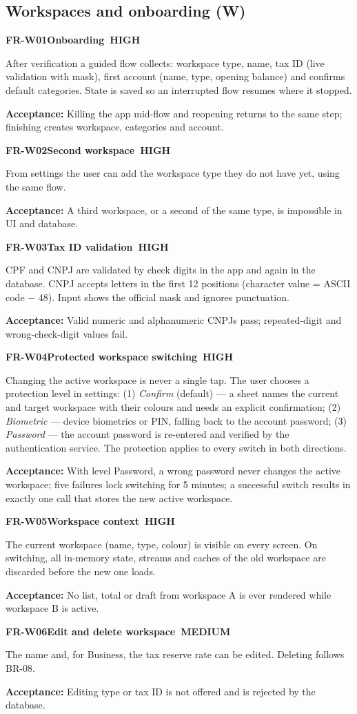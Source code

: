 \documentclass[11pt,a4paper]{article}
\newcommand{\PH}{\colorbox{finlyblue}{\color{white}\scriptsize\bfseries\ HIGH\ }}
\newcommand{\PM}{\colorbox{finlygold}{\color{finlydark}\scriptsize\bfseries\ MEDIUM\ }}
\newcommand{\req}[5]{%
  \begin{tcolorbox}[reqbox]
    {\small\textbf{\textcolor{finlyblue}{#1}}\quad\textbf{#2}\hfill #3}\par\vspace{2pt}
    {\small #4}\par\vspace{2pt}
    {\footnotesize\textcolor{finlytext}{\textbf{Acceptance:} #5}}
  \end{tcolorbox}}
\begin{document}
\subsection{Workspaces and onboarding (W)}
\req{FR-W01}{Onboarding}{\PH}{After verification a guided flow collects: workspace type, name, tax ID (live validation with mask), first account (name, type, opening balance) and confirms default categories. State is saved so an interrupted flow resumes where it stopped.}
{Killing the app mid-flow and reopening returns to the same step; finishing creates workspace, categories and account.}
\req{FR-W02}{Second workspace}{\PH}{From settings the user can add the workspace type they do not have yet, using the same flow.}
{A third workspace, or a second of the same type, is impossible in UI and database.}
\req{FR-W03}{Tax ID validation}{\PH}{CPF and CNPJ are validated by check digits in the app and again in the database. CNPJ accepts letters in the first 12 positions (character value = ASCII code $-$ 48). Input shows the official mask and ignores punctuation.}
{Valid numeric and alphanumeric CNPJs pass; repeated-digit and wrong-check-digit values fail.}
\req{FR-W04}{Protected workspace switching}{\PH}{Changing the active workspace is never a single tap. The user chooses a protection level in settings: (1) \emph{Confirm} (default) --- a sheet names the current and target workspace with their colours and needs an explicit confirmation; (2) \emph{Biometric} --- device biometrics or PIN, falling back to the account password; (3) \emph{Password} --- the account password is re-entered and verified by the authentication service. The protection applies to every switch in both directions.}
{With level Password, a wrong password never changes the active workspace; five failures lock switching for 5 minutes; a successful switch results in exactly one call that stores the new active workspace.}
\req{FR-W05}{Workspace context}{\PH}{The current workspace (name, type, colour) is visible on every screen. On switching, all in-memory state, streams and caches of the old workspace are discarded before the new one loads.}
{No list, total or draft from workspace A is ever rendered while workspace B is active.}
\req{FR-W06}{Edit and delete workspace}{\PM}{The name and, for Business, the tax reserve rate can be edited. Deleting follows BR-08.}
{Editing type or tax ID is not offered and is rejected by the database.}
\end{document}
